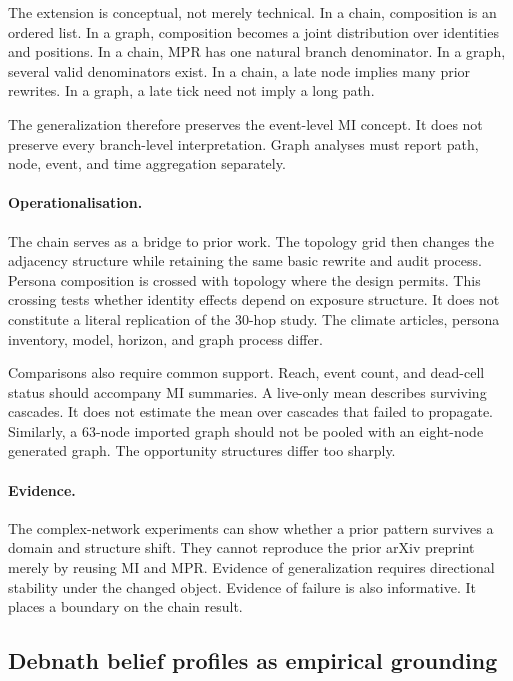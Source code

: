The extension is conceptual, not merely technical.
In a chain, composition is an ordered list.
In a graph, composition becomes a joint distribution over identities and positions.
In a chain, MPR has one natural branch denominator.
In a graph, several valid denominators exist.
In a chain, a late node implies many prior rewrites.
In a graph, a late tick need not imply a long path.

The generalization therefore preserves the event-level MI concept.
It does not preserve every branch-level interpretation.
Graph analyses must report path, node, event, and time aggregation separately.

\paragraph{Operationalisation.}
The chain serves as a bridge to prior work.
The topology grid then changes the adjacency structure while retaining the same basic rewrite and audit process.
Persona composition is crossed with topology where the design permits.
This crossing tests whether identity effects depend on exposure structure.
It does not constitute a literal replication of the 30-hop study.
The climate articles, persona inventory, model, horizon, and graph process differ.

Comparisons also require common support.
Reach, event count, and dead-cell status should accompany MI summaries.
A live-only mean describes surviving cascades.
It does not estimate the mean over cascades that failed to propagate.
Similarly, a 63-node imported graph should not be pooled with an eight-node generated graph.
The opportunity structures differ too sharply.

\paragraph{Evidence.}
The complex-network experiments can show whether a prior pattern survives a domain and structure shift.
They cannot reproduce the prior arXiv preprint merely by reusing MI and MPR.
Evidence of generalization requires directional stability under the changed object.
Evidence of failure is also informative.
It places a boundary on the chain result.

\subsection{Debnath belief profiles as empirical grounding}
\label{subsec:debnath-profiles}

